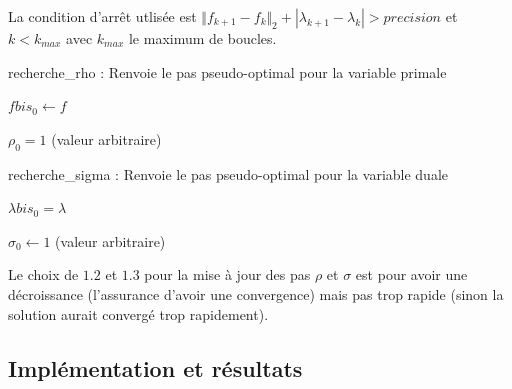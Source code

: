 \documentclass[10pt,a4paper]{article}
\newcommand{\R}{\mathbb{R}}
\theoremstyle{plain}
\theoremstyle{definition}
\begin{document}
La condition d'arrêt utlisée est $\Vert f_{k+1}-f_k\Vert_2 + |\lambda_{k+1}-\lambda_k| > precision$ et $k < k_{max}$ avec $k_{max}$ le maximum de boucles.

\begin{algorithm}
\caption{recherche\_rho : Renvoie le pas pseudo-optimal pour la variable primale}
\label{algo:primale}

	\KwIn{$f \in \R^n$ et $\lambda \in \R$}

	$fbis_0 \leftarrow f$

	$\rho_0 = 1$ (valeur arbitraire)


\end{algorithm}

\begin{algorithm}
	\caption{recherche\_sigma : Renvoie le pas pseudo-optimal pour la variable duale}
	\label{algo:duale}
	
	\KwIn{$f \in \R^n$ et $\lambda \in \R$}
	$\lambda bis_0 = \lambda$

	$\sigma_0 \leftarrow 1$ (valeur arbitraire)

	
\end{algorithm}

Le choix de $1.2$ et $1.3$ pour la mise à jour des pas $\rho$ et $\sigma$ est pour avoir une décroissance (l'assurance d'avoir une convergence) mais pas trop rapide (sinon la solution aurait convergé trop rapidement).




\subsection{Implémentation et résultats}
\end{document}
